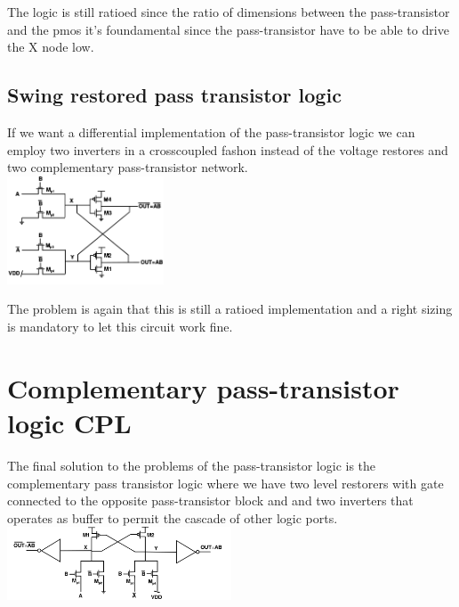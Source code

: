 The logic is still ratioed since the ratio of dimensions between the pass-transistor and the pmos it's foundamental since the pass-transistor have to be able to drive the X node low.\\
\subsection{Swing restored pass transistor logic}

If we want a differential implementation of the pass-transistor logic we can employ two inverters in a crosscoupled fashon instead of the voltage restores and two complementary pass-transistor network.\\

\centering
\includegraphics[width=0.35\textwidth]{C8_3.png}\\
\raggedright

The problem is again that this is still a ratioed implementation and a right sizing is mandatory to let this circuit work fine.\\




\section{Complementary pass-transistor logic CPL}
The final solution to the problems of the pass-transistor logic is the complementary pass transistor logic where we have two level restorers with gate connected to the opposite pass-transistor block and and two inverters that operates as buffer to permit the cascade of other logic ports.\\

\vspace{5mm}
\centering
\includegraphics[width=0.5\textwidth]{C8_4.png}\\
\raggedright
\vspace{5mm}

